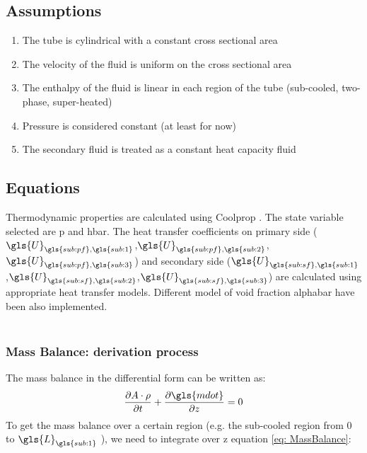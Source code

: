 \documentclass[11pt]{article} %
\begin{document}
\subsection{Assumptions}
\begin{enumerate}
\renewcommand{\theenumi}{\roman{enumi}}
\item The tube is cylindrical with a constant cross sectional area
\item The velocity of the fluid is uniform on the cross sectional area
\item The enthalpy of the fluid is linear in each region of the tube (sub-cooled, two-phase, super-heated)
\item Pressure is considered constant (at least for now)
\item The secondary fluid is treated as a constant heat capacity fluid
\end{enumerate}
\subsection{Equations}
Thermodynamic properties are calculated using Coolprop \cite{Bell2013}. The state variable selected are \gls{p} and \gls{hbar}. The heat transfer coefficients on primary side ($\gls{U}_{\gls{sub:pf},\gls{sub:1}}$,$\gls{U}_{\gls{sub:pf},\gls{sub:2}}$,$\gls{U}_{\gls{sub:pf},\gls{sub:3}}$) and secondary side ($\gls{U}_{\gls{sub:sf},\gls{sub:1}}$,$\gls{U}_{\gls{sub:sf},\gls{sub:2}}$,$\gls{U}_{\gls{sub:sf},\gls{sub:3}}$) are calculated using appropriate heat transfer models. Different model of void fraction \gls{alphabar} have been also implemented.\\
\\

\subsubsection{Mass Balance: derivation process}
The mass balance in the differential form can be written as:
\begin{equation}
\frac{\partial A \cdot \rho}{\partial t} + \frac{\partial \gls{mdot}}{\partial z}= 0
\label{eq: MassBalance}
\end{equation}
To get the mass balance over a certain region (e.g. the sub-cooled region from 0 to $\gls{L}_{\gls{sub:1}}$ ), we need to integrate over z equation \ref{eq: MassBalance}:
\end{document}
